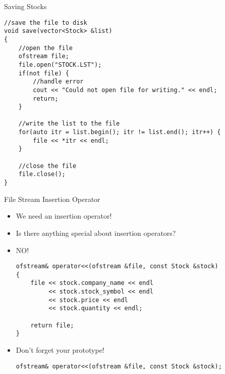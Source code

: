 \documentclass[]{beamer}
\begin{document}
\begin{frame}[fragile]{Saving Stocks}
\begin{adjustbox}{max totalheight=0.9\textheight}
\begin{BVerbatim}
//save the file to disk
void save(vector<Stock> &list) 
{
    //open the file
    ofstream file;
    file.open("STOCK.LST");
    if(not file) {
        //handle error
        cout << "Could not open file for writing." << endl;
        return;
    }

    //write the list to the file
    for(auto itr = list.begin(); itr != list.end(); itr++) {
        file << *itr << endl;
    }

    //close the file
    file.close();
}
\end{BVerbatim}
\end{adjustbox}
\end{frame}


\begin{frame}[fragile]{File Stream Insertion Operator}
    \begin{itemize}[<+->]
        \item We need an insertion operator!
        \item Is there anything special about insertion operators?
        \item NO! 
        \begin{adjustbox}{max width=0.9\textwidth}
        \begin{BVerbatim}
ofstream& operator<<(ofstream &file, const Stock &stock)
{
    file << stock.company_name << endl
         << stock.stock_symbol << endl
         << stock.price << endl
         << stock.quantity << endl;

    return file;
}
        \end{BVerbatim}
        \end{adjustbox}

        \item Don't forget your prototype!
        \begin{adjustbox}{max width=0.9\textwidth}
        \begin{BVerbatim}
ofstream& operator<<(ofstream &file, const Stock &stock);
        \end{BVerbatim}
        \end{adjustbox}
    \end{itemize}
\end{frame}
\end{document}
